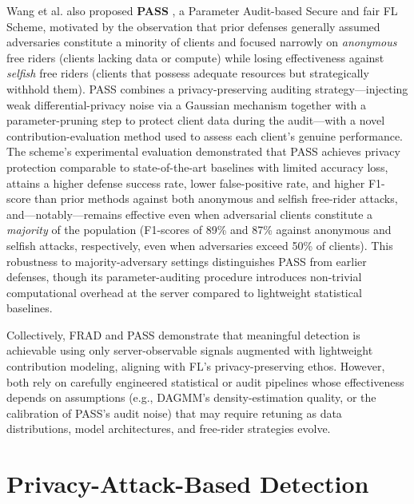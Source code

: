 Wang et al. also proposed \textbf{PASS} \cite{wang2023pass}, a Parameter Audit-based Secure and fair FL Scheme, motivated by the observation that prior defenses generally assumed adversaries constitute a minority of clients and focused narrowly on \emph{anonymous} free riders (clients lacking data or compute) while losing effectiveness against \emph{selfish} free riders (clients that possess adequate resources but strategically withhold them). PASS combines a privacy-preserving auditing strategy—injecting weak differential-privacy noise via a Gaussian mechanism together with a parameter-pruning step to protect client data during the audit—with a novel contribution-evaluation method used to assess each client's genuine performance. The scheme's experimental evaluation demonstrated that PASS achieves privacy protection comparable to state-of-the-art baselines with limited accuracy loss, attains a higher defense success rate, lower false-positive rate, and higher F1-score than prior methods against both anonymous and selfish free-rider attacks, and—notably—remains effective even when adversarial clients constitute a \emph{majority} of the population (F1-scores of 89\% and 87\% against anonymous and selfish attacks, respectively, even when adversaries exceed 50\% of clients). This robustness to majority-adversary settings distinguishes PASS from earlier defenses, though its parameter-auditing procedure introduces non-trivial computational overhead at the server compared to lightweight statistical baselines.

Collectively, FRAD and PASS demonstrate that meaningful detection is achievable using only server-observable signals augmented with lightweight contribution modeling, aligning with FL's privacy-preserving ethos. However, both rely on carefully engineered statistical or audit pipelines whose effectiveness depends on assumptions (e.g., DAGMM's density-estimation quality, or the calibration of PASS's audit noise) that may require retuning as data distributions, model architectures, and free-rider strategies evolve.

\section{Privacy-Attack-Based Detection}
\label{subsec:privacy-attack-based}

